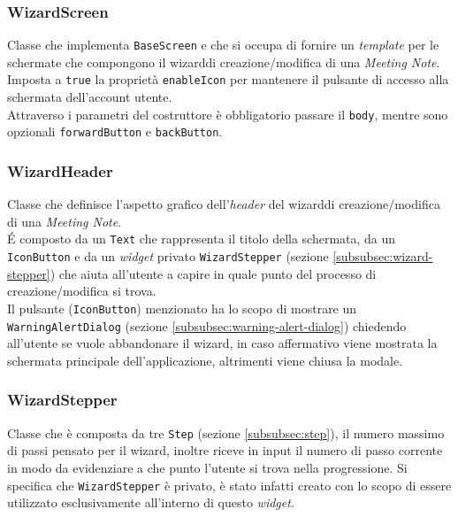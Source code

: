 \subsubsection*{WizardScreen}
\label{subsubsec:wizard-screen}

Classe che implementa \lstinline{BaseScreen} e che si occupa di fornire un \emph{template} per le schermate che compongono il \gls{wizard}\glsoccur di creazione/modifica di una \emph{Meeting Note}.\\
Imposta a \lstinline{true} la proprietà \lstinline{enableIcon} per mantenere il pulsante di accesso alla schermata dell'account utente.\\
Attraverso i parametri del costruttore è obbligatorio passare il \lstinline{body}, mentre sono opzionali \lstinline{forwardButton} e \lstinline{backButton}.

\subsubsection*{WizardHeader}
\label{subsubsec:wizard-header}

Classe che definisce l'aspetto grafico dell'\emph{header} del \gls{wizard}\glsoccur di creazione/modifica di una \emph{Meeting Note}.\\
É composto da un \lstinline{Text}\cite{site:text} che rappresenta il titolo della schermata, da un \lstinline{IconButton}\cite{site:icon-button} e da un \emph{widget} privato \lstinline{WizardStepper} (sezione \ref{subsubsec:wizard-stepper}) che aiuta all'utente a capire in quale punto del processo di creazione/modifica si trova.\\
Il pulsante (\lstinline{IconButton}) menzionato ha lo scopo di mostrare un \lstinline{WarningAlertDialog} (sezione \ref{subsubsec:warning-alert-dialog}) chiedendo all'utente se vuole abbandonare il \gls{wizard}\glsoccur, in caso affermativo viene mostrata la schermata principale dell'applicazione, altrimenti viene chiusa la modale. 

\subsubsection*{WizardStepper}
\label{subsubsec:wizard-stepper}

Classe che è composta da tre \lstinline{Step} (sezione \ref{subsubsec:step}), il numero massimo di passi pensato per il \gls{wizard}\glsoccur, inoltre riceve in input il numero di passo corrente in modo da evidenziare a che punto l'utente si trova nella progressione.
Si specifica che \lstinline{WizardStepper} è privato, è stato infatti creato con lo scopo di essere utilizzato esclusivamente all'interno di questo \emph{widget}.\\

